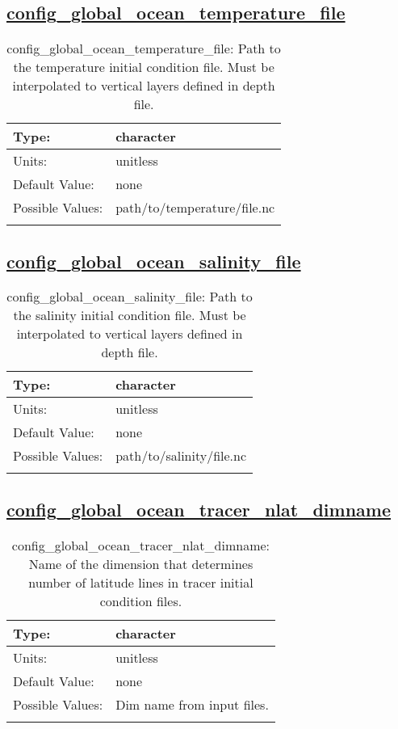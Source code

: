 \subsection[config\_global\_ocean\_temperature\_file]{\hyperref[sec:nm_tab_global_ocean]{config\_global\_ocean\_temperature\_file}}
\label{subsec:nm_sec_config_global_ocean_temperature_file}
\begin{center}
\begin{longtable}{| p{2.0in} || p{4.0in} |}
    \hline
    Type: & character \\
    \hline
    Units: & \si{unitless} \\
    \hline
    Default Value: & none \\
    \hline
    Possible Values: & path/to/temperature/file.nc \\
    \hline
    \caption{config\_global\_ocean\_temperature\_file: Path to the temperature initial condition file. Must be interpolated to vertical layers defined in depth file.}
\end{longtable}
\end{center}
\subsection[config\_global\_ocean\_salinity\_file]{\hyperref[sec:nm_tab_global_ocean]{config\_global\_ocean\_salinity\_file}}
\label{subsec:nm_sec_config_global_ocean_salinity_file}
\begin{center}
\begin{longtable}{| p{2.0in} || p{4.0in} |}
    \hline
    Type: & character \\
    \hline
    Units: & \si{unitless} \\
    \hline
    Default Value: & none \\
    \hline
    Possible Values: & path/to/salinity/file.nc \\
    \hline
    \caption{config\_global\_ocean\_salinity\_file: Path to the salinity initial condition file. Must be interpolated to vertical layers defined in depth file.}
\end{longtable}
\end{center}
\subsection[config\_global\_ocean\_tracer\_nlat\_dimname]{\hyperref[sec:nm_tab_global_ocean]{config\_global\_ocean\_tracer\_nlat\_dimname}}
\label{subsec:nm_sec_config_global_ocean_tracer_nlat_dimname}
\begin{center}
\begin{longtable}{| p{2.0in} || p{4.0in} |}
    \hline
    Type: & character \\
    \hline
    Units: & \si{unitless} \\
    \hline
    Default Value: & none \\
    \hline
    Possible Values: & Dim name from input files. \\
    \hline
    \caption{config\_global\_ocean\_tracer\_nlat\_dimname: Name of the dimension that determines number of latitude lines in tracer initial condition files.}
\end{longtable}
\end{center}
